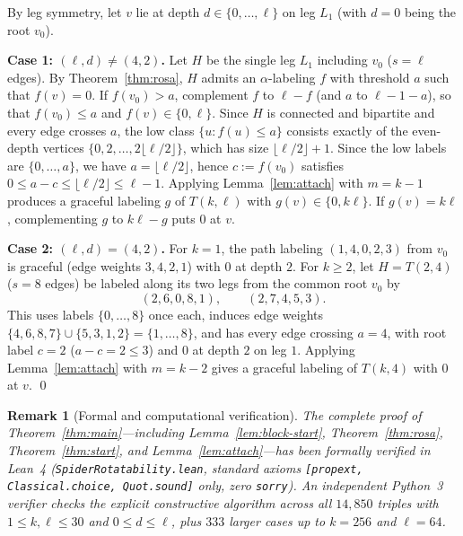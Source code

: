 \documentclass[11pt]{article}
\newtheorem{remark}[theorem]{Remark}
\begin{document}
By leg symmetry, let $v$ lie at depth $d \in \{0, \dots, \ell\}$ on leg $L_1$ (with $d = 0$ being the root $v_0$).

\medskip\noindent\textbf{Case 1: $(\ell, d) \ne (4, 2)$.}
Let $H$ be the single leg $L_1$ including $v_0$ ($s = \ell$ edges). By Theorem~\ref{thm:rosa}, $H$ admits an $\alpha$-labeling $f$ with threshold $a$ such that $f(v) = 0$. If $f(v_0) > a$, complement $f$ to $\ell - f$ (and $a$ to $\ell - 1 - a$), so that $f(v_0) \le a$ and $f(v) \in \{0, \ell\}$. Since $H$ is connected and bipartite and every edge crosses $a$, the low class $\{u : f(u) \le a\}$ consists exactly of the even-depth vertices $\{0, 2, \dots, 2\lfloor \ell/2 \rfloor\}$, which has size $\lfloor \ell/2 \rfloor + 1$. Since the low labels are $\{0, \dots, a\}$, we have $a = \lfloor \ell/2 \rfloor$, hence $c := f(v_0)$ satisfies $0 \le a - c \le \lfloor \ell/2 \rfloor \le \ell - 1$. Applying Lemma~\ref{lem:attach} with $m = k - 1$ produces a graceful labeling $g$ of $T(k, \ell)$ with $g(v) \in \{0, k\ell\}$. If $g(v) = k\ell$, complementing $g$ to $k\ell - g$ puts $0$ at $v$.

\medskip\noindent\textbf{Case 2: $(\ell, d) = (4, 2)$.}
For $k = 1$, the path labeling $(1, 4, 0, 2, 3)$ from $v_0$ is graceful (edge weights $3, 4, 2, 1$) with $0$ at depth $2$. For $k \ge 2$, let $H = T(2, 4)$ ($s = 8$ edges) be labeled along its two legs from the common root $v_0$ by
\[
(2, 6, 0, 8, 1), \qquad (2, 7, 4, 5, 3).
\]
This uses labels $\{0, \dots, 8\}$ once each, induces edge weights $\{4, 6, 8, 7\} \cup \{5, 3, 1, 2\} = \{1, \dots, 8\}$, and has every edge crossing $a = 4$, with root label $c = 2$ ($a - c = 2 \le 3$) and $0$ at depth $2$ on leg $1$. Applying Lemma~\ref{lem:attach} with $m = k - 2$ gives a graceful labeling of $T(k, 4)$ with $0$ at $v$. \qed

\begin{remark}[Formal and computational verification]
The complete proof of Theorem~\ref{thm:main}---including Lemma~\ref{lem:block-start}, Theorem~\ref{thm:rosa}, Theorem~\ref{thm:start}, and Lemma~\ref{lem:attach}---has been formally verified in Lean~4 (\texttt{SpiderRotatability.lean}, standard axioms \texttt{[propext, Classical.choice, Quot.sound]} only, zero \texttt{sorry}). An independent Python~3 verifier checks the explicit constructive algorithm across all $14{,}850$ triples with $1 \le k, \ell \le 30$ and $0 \le d \le \ell$, plus $333$ larger cases up to $k = 256$ and $\ell = 64$.
\end{remark}
\end{document}
